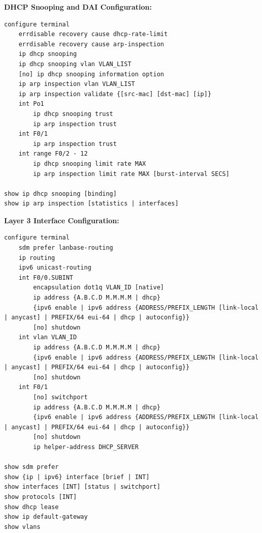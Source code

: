 \documentclass[12pt]{article}
\begin{document}
	\noindent\textbf{DHCP Snooping and DAI Configuration:}
	\begin{lstlisting}
configure terminal
	errdisable recovery cause dhcp-rate-limit
	errdisable recovery cause arp-inspection
	ip dhcp snooping
	ip dhcp snooping vlan VLAN_LIST
	[no] ip dhcp snooping information option
	ip arp inspection vlan VLAN_LIST
	ip arp inspection validate {[src-mac] [dst-mac] [ip]}
	int Po1
		ip dhcp snooping trust
		ip arp inspection trust
	int F0/1
		ip arp inspection trust
	int range F0/2 - 12
		ip dhcp snooping limit rate MAX
		ip arp inspection limit rate MAX [burst-interval SECS]

show ip dhcp snooping [binding]
show ip arp inspection [statistics | interfaces]
	\end{lstlisting}
	\vspace{8px}

	\noindent\textbf{Layer 3 Interface Configuration:}
	\begin{lstlisting}
configure terminal
	sdm prefer lanbase-routing
	ip routing
	ipv6 unicast-routing
	int F0/0.SUBINT
		encapsulation dot1q VLAN_ID [native]
		ip address {A.B.C.D M.M.M.M | dhcp}
		{ipv6 enable | ipv6 address {ADDRESS/PREFIX_LENGTH [link-local | anycast] | PREFIX/64 eui-64 | dhcp | autoconfig}}
		[no] shutdown
	int vlan VLAN_ID
		ip address {A.B.C.D M.M.M.M | dhcp}
		{ipv6 enable | ipv6 address {ADDRESS/PREFIX_LENGTH [link-local | anycast] | PREFIX/64 eui-64 | dhcp | autoconfig}}
		[no] shutdown
	int F0/1
		[no] switchport
		ip address {A.B.C.D M.M.M.M | dhcp}
		{ipv6 enable | ipv6 address {ADDRESS/PREFIX_LENGTH [link-local | anycast] | PREFIX/64 eui-64 | dhcp | autoconfig}}
		[no] shutdown
		ip helper-address DHCP_SERVER

show sdm prefer
show {ip | ipv6} interface [brief | INT]
show interfaces [INT] [status | switchport]
show protocols [INT]
show dhcp lease
show ip default-gateway
show vlans
	\end{lstlisting}
	\vspace{8px}
	
\end{document}
